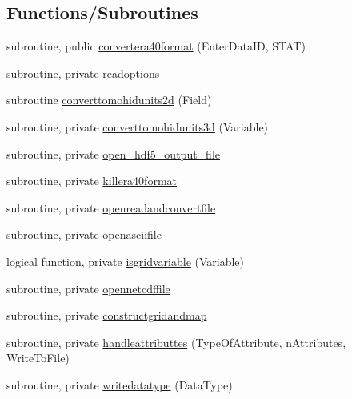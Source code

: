 \subsection*{Functions/\+Subroutines}
\begin{DoxyCompactItemize}
\item 
subroutine, public \mbox{\hyperlink{namespacemoduleera40format_a0ebf94dc06f2741d57181016580896b9}{convertera40format}} (Enter\+Data\+ID, S\+T\+AT)
\item 
subroutine, private \mbox{\hyperlink{namespacemoduleera40format_a26224b66b1a9302c71025953c7303ed6}{readoptions}}
\item 
subroutine \mbox{\hyperlink{namespacemoduleera40format_a4a4d9db2a785bd8a90d6860faf58c6bf}{converttomohidunits2d}} (Field)
\item 
subroutine, private \mbox{\hyperlink{namespacemoduleera40format_a407d38960a0ddf8b9d1645d26d35d49b}{converttomohidunits3d}} (Variable)
\item 
subroutine, private \mbox{\hyperlink{namespacemoduleera40format_a84aefcd4351fc116d22a21fdfce2ec4f}{open\+\_\+hdf5\+\_\+output\+\_\+file}}
\item 
subroutine, private \mbox{\hyperlink{namespacemoduleera40format_aa8632d63af3434480b59776e3b58b294}{killera40format}}
\item 
subroutine, private \mbox{\hyperlink{namespacemoduleera40format_ab03a5122cb83fd0b3153870ed6bf1cdc}{openreadandconvertfile}}
\item 
subroutine, private \mbox{\hyperlink{namespacemoduleera40format_aeaa93e0eaf981081d8b6a42b94714211}{openasciifile}}
\item 
logical function, private \mbox{\hyperlink{namespacemoduleera40format_a5d0edb2c39da4714b1bffb8a6c97b1a2}{isgridvariable}} (Variable)
\item 
subroutine, private \mbox{\hyperlink{namespacemoduleera40format_a462785fbcd7874f4f3ab321366b79ec9}{opennetcdffile}}
\item 
subroutine, private \mbox{\hyperlink{namespacemoduleera40format_ad4271c51cd4bfc71c5ed5743a60e7fef}{constructgridandmap}}
\item 
subroutine, private \mbox{\hyperlink{namespacemoduleera40format_adaf25cab272ca9c6e2db6b1f641c0136}{handleattributtes}} (Type\+Of\+Attribute, n\+Attributes, Write\+To\+File)
\item 
subroutine, private \mbox{\hyperlink{namespacemoduleera40format_accbbdcac1635a00be7ca33013f811a29}{writedatatype}} (Data\+Type)
\item 

\end{DoxyCompactItemize}
